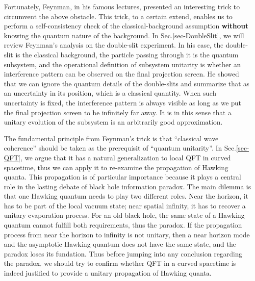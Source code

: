 \documentclass[aps,showpacs,twocolumn,floats,prd,superscriptaddress,nofootinbib]{revtex4-1}
\begin{document}
Fortunately, Feynman, in his famous lectures, presented an interesting trick to circumvent the above obstacle. 
This trick, to a certain extend, enables us to perform a self-consistency check of the classical-background assumption {\bf without} knowing the quantum nature of the background.
In Sec.\ref{sec-DoubleSlit}, we will review Feynman's analysis on the double-slit experiment. 
In his case, the double-slit is the classical background, the particle passing through it is the quantum subsystem, and the operational definition of subsystem unitarity is whether an interference pattern can be observed on the final projection screen. 
He showed that we can ignore the quantum details of the double-slits and summarize that as an uncertainty in its position, which is a classical quantity. 
When such uncertainty is fixed, the interference pattern is always visible as long as we put the final projection screen to be infinitely far away. 
It is in this sense that a unitary evolution of the subsystem is an arbitrarily good approximation.

The fundamental principle from Feynman's trick is that ``classical wave coherence'' should be taken as the prerequisit of ``quantum unitarity''. 
In Sec.\ref{sec-QFT}, we argue that it has a natural generalization to local QFT in curved spacetime, thus we can apply it to re-examine the propagation of Hawking quanta. 
This propagation is of particular importance because it plays a central role in the lasting debate of black hole information paradox. 
The main dilemma is that one Hawking quantum needs to play two different roles. 
Near the horizon, it has to be part of the local vacuum state; near spatial infinity, it has to recover a unitary evaporation process. 
For an old black hole, the same state of a Hawking quantum cannot fulfill both requirements, thus the paradox. 
If the propagation process from near the horizon to infinity is not unitary, then a near horizon mode and the asymptotic Hawking quantum does not have the same state, and the paradox loses its fundation. 
Thus before jumping into any conclusion regarding the paradox, we should try to confirm whether QFT in a curved spacetime is indeed justified to provide a unitary propagation of Hawking quanta.
\end{document}
